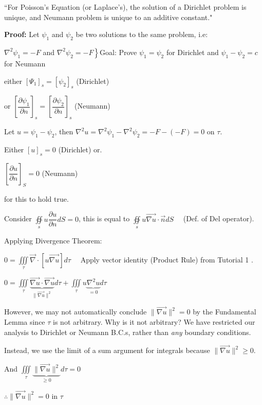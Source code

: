 \documentclass{report}
\begin{document}
``For Poisson's Equation (or Laplace's), the solution of a Dirichlet problem is unique, and Neumann problem is unique to an additive constant."


\textbf{Proof:} Let $\psi_{1}$ and $\psi_{2}$ be two solutions to the same problem, i.e:

$\nabla^{2} \psi_{1}=-F$ and $\left.\nabla^{2} \psi_{2}=-F\right\}$\qquad Goal: Prove $\psi_{1}=\psi_{2}$ for Dirichlet and $\psi_{1}-\psi_{2}=c$ for Neumann

either $\left[\Psi_{1}\right]_{s}=\left[\psi_{2}\right]_{s}$ (Dirichlet) 

or $\left[\dfrac{\partial \psi_{1}}{\partial n}\right]_{s}=\left[\dfrac{\partial \psi_{2}}{\partial n}\right]_{s}$ (Neumann)

Let $u=\psi_{1}-\psi_{2}$, then $\nabla^{2} u=\nabla^{2} \psi_{1}-\nabla^{2} \psi_{2}=-F-(-F)=0$ on $\tau.$

Either $[u]_{s}=0$ (Dirichlet) 
or. 

$\left[\dfrac{\partial u}{\partial n}\right]_{S}=0$ (Neumann)

for this to hold true.

Consider $\oiint\limits_{s} u \dfrac{\partial u}{\partial n} d S=0$, this is equal to $\oiint\limits_{s} u \overrightarrow{\nabla u} \cdot \vec{n} d S \quad$ (Def. of Del operator).

Applying Divergence Theorem:

$0=\iiint\limits_{\tau} \vec{\nabla} \cdot[u \overrightarrow{\nabla u}] d \tau \quad$ Apply vector identity (Product Rule) from Tutorial 1 .


$0=\iiint\limits_{\tau} \underbrace{\overrightarrow{\nabla u} \cdot \overrightarrow{\nabla u}}_{\|\overrightarrow{\nabla u}\|^{2}} d \tau+\iiint\limits_{\tau} u \underbrace{\nabla^{2} u}_{=0} d \tau
$

However, we may not automatically conclude $\|\overrightarrow{\nabla u}\|^{2}=0$ by the Fundamental Lemma since $\tau$ is not arbitrary. Why is it not arbitrary? We have restricted our analysis to Dirichlet or Neumann B.C.s, rather than \textit{any} boundary conditions. 

Instead, we use the limit of a sum argument for integrals because $\|\overrightarrow{\nabla u}\|^{2} \geqslant 0$.

And $\iiint\limits_{\tau} \underbrace{\|\vec{\nabla u}\|^{2}}_{\geq 0} d \tau=0 \quad$ 

$\therefore\|\overrightarrow{\nabla u}\|^2=0$ in $\tau$
\end{document}
